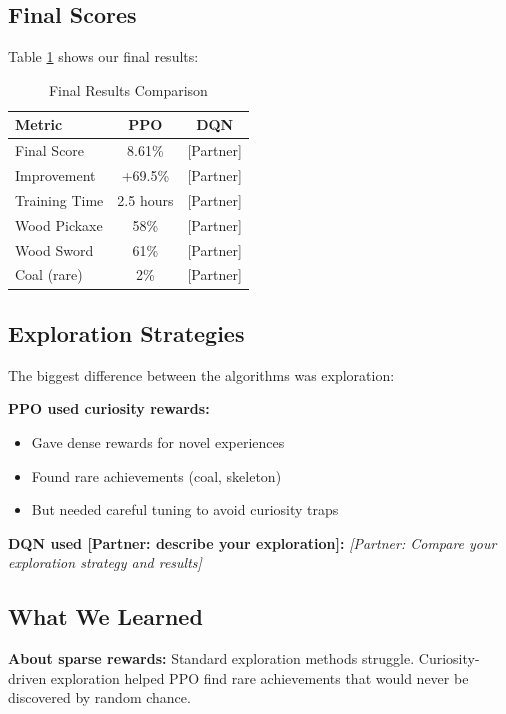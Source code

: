 \documentclass[conference]{IEEEtran}
\begin{document}
\subsection{Final Scores}

Table \ref{tab:results} shows our final results:

\begin{table}[h]
\centering
\caption{Final Results Comparison}
\label{tab:results}
\begin{tabular}{lcc}
\toprule
\textbf{Metric} & \textbf{PPO} & \textbf{DQN} \\
\midrule
Final Score & 8.61\% & [Partner] \\
Improvement & +69.5\% & [Partner] \\
Training Time & 2.5 hours & [Partner] \\
Wood Pickaxe & 58\% & [Partner] \\
Wood Sword & 61\% & [Partner] \\
Coal (rare) & 2\% & [Partner] \\
\bottomrule
\end{tabular}
\end{table}

\subsection{Exploration Strategies}

The biggest difference between the algorithms was exploration:

\textbf{PPO used curiosity rewards:}
\begin{itemize}
    \item Gave dense rewards for novel experiences
    \item Found rare achievements (coal, skeleton)
    \item But needed careful tuning to avoid curiosity traps
\end{itemize}

\textbf{DQN used [Partner: describe your exploration]:}
\textit{[Partner: Compare your exploration strategy and results]}

\subsection{What We Learned}

\textbf{About sparse rewards:} Standard exploration methods struggle. Curiosity-driven exploration helped PPO find rare achievements that would never be discovered by random chance.
\end{document}
